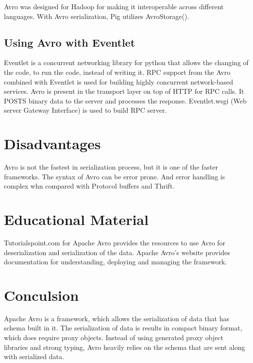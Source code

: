 \documentclass[9pt,twocolumn,twoside]{../../styles/osajnl}
\begin{document}
Avro was designed for Hadoop for making it interoperable across
different languages.  With Avro serialization, Pig utilizes
AvroStorage().

\subsection{Using Avro with Eventlet}

Eventlet is a concurrent networking library for python that allows the
changing of the code, to run the code, instead of writing it.  RPC
support from the Avro combined with Eventlet is used for building
highly concurrent network-based services. Avro is present in the
transport layer on top of HTTP for RPC calls. It POSTS binary data to
the server and processes the response. Eventlet.wsgi (Web server
Gateway Interface) is used to build RPC server.

\section{Disadvantages}

Avro is not the fastest in serialization process, but it is one of the
faster frameworks.  The syntax of Avro can be error prone. And error
handling is complex whn compared with Protocol buffers and Thrift.

\section{Educational Material}

Tutorialspoint.com \cite{www-tutorialspoint-avro}for Apache Avro
provides the resources to use Avro for deserialization and
serialization of the data.  Apache Avro’s \cite{www-apache-avro} website provides
documentation for understanding, deploying and managing the framework.

\section{Conculsion}

Apache Avro is a framework, which allows the serialization of data
that has schema built in it. The serialization of data is results in
compact binary format, which does require proxy objects. Instead of
using generated proxy object libraries and strong typing, Avro heavily
relies on the schema that are sent along with serialized data.


\end{document}
